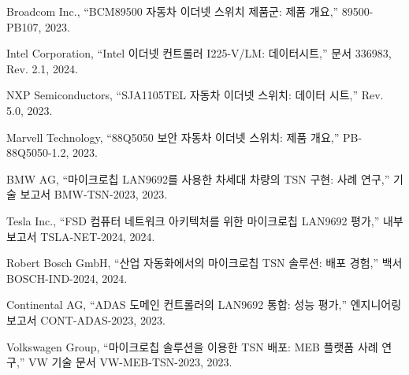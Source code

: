 \documentclass[twocolumn,10pt]{article}
\begin{document}
\begin{thebibliography}{99}
Broadcom Inc., ``BCM89500 자동차 이더넷 스위치 제품군: 제품 개요,'' 89500-PB107, 2023.

Intel Corporation, ``Intel 이더넷 컨트롤러 I225-V/LM: 데이터시트,'' 문서 336983, Rev. 2.1, 2024.

NXP Semiconductors, ``SJA1105TEL 자동차 이더넷 스위치: 데이터 시트,'' Rev. 5.0, 2023.

Marvell Technology, ``88Q5050 보안 자동차 이더넷 스위치: 제품 개요,'' PB-88Q5050-1.2, 2023.

BMW AG, ``마이크로칩 LAN9692를 사용한 차세대 차량의 TSN 구현: 사례 연구,'' 기술 보고서 BMW-TSN-2023, 2023.

Tesla Inc., ``FSD 컴퓨터 네트워크 아키텍처를 위한 마이크로칩 LAN9692 평가,'' 내부 보고서 TSLA-NET-2024, 2024.

Robert Bosch GmbH, ``산업 자동화에서의 마이크로칩 TSN 솔루션: 배포 경험,'' 백서 BOSCH-IND-2024, 2024.

Continental AG, ``ADAS 도메인 컨트롤러의 LAN9692 통합: 성능 평가,'' 엔지니어링 보고서 CONT-ADAS-2023, 2023.

Volkswagen Group, ``마이크로칩 솔루션을 이용한 TSN 배포: MEB 플랫폼 사례 연구,'' VW 기술 문서 VW-MEB-TSN-2023, 2023.

\end{thebibliography}
\end{document}
